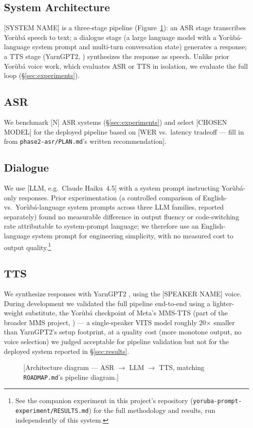 \subsection{System Architecture}

[SYSTEM NAME] is a three-stage pipeline (Figure~\ref{fig:architecture}):
an ASR stage transcribes Yor\`ub\'a speech to text; a dialogue stage
(a large language model with a Yor\`ub\'a-language system prompt and
multi-turn conversation state) generates a response; a TTS stage
(YarnGPT2, \citealp{yarngpt2}) synthesizes the response as speech. Unlike
prior Yor\`ub\'a voice work, which evaluates ASR or TTS in isolation, we
evaluate the full loop (\S\ref{sec:experiments}).

\subsection{ASR}
We benchmark [N] ASR systems (\S\ref{sec:experiments}) and select
[CHOSEN MODEL] for the deployed pipeline based on [WER vs.\ latency
tradeoff — fill in from \texttt{phase2-asr/PLAN.md}'s written
recommendation].

\subsection{Dialogue}
We use [LLM, e.g.\ Claude Haiku~4.5] with a system prompt instructing
Yor\`ub\'a-only responses. Prior experimentation (a controlled comparison
of English- vs.\ Yor\`ub\'a-language system prompts across three LLM
families, reported separately) found no measurable difference in output
fluency or code-switching rate attributable to system-prompt language;
we therefore use an English-language system prompt for engineering
simplicity, with no measured cost to output quality.\footnote{See the
companion experiment in this project's repository
(\texttt{yoruba-prompt-experiment/RESULTS.md}) for the full methodology
and results, run independently of this system.}

\subsection{TTS}
We synthesize responses with YarnGPT2 \citep{yarngpt2}, using the
[SPEAKER NAME] voice. During development we validated the full pipeline
end-to-end using a lighter-weight substitute, the Yor\`ub\'a checkpoint of
Meta's MMS-TTS \citep{mms-tts} (part of the broader MMS project,
\citealp{mms}) --- a single-speaker VITS model roughly 20$\times$ smaller
than YarnGPT2's setup footprint, at a quality cost (more monotone output,
no voice selection) we judged acceptable for pipeline validation but not
for the deployed system reported in \S\ref{sec:results}.

\begin{figure}[t]
\centering
\caption{[Architecture diagram — ASR $\to$ LLM $\to$ TTS, matching
\texttt{ROADMAP.md}'s pipeline diagram.]}
\label{fig:architecture}
\end{figure}

